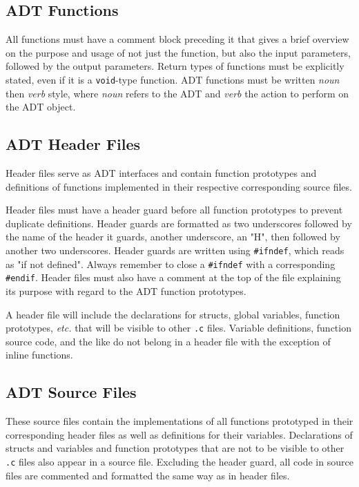 \documentclass[11pt]{article}
\begin{document}
\subsection{ADT Functions}

All functions must have a comment block preceding it that gives a brief overview
on the purpose and usage of not just the function, but also the input
parameters, followed by the output parameters. Return types of functions must be
explicitly stated, even if it is a \texttt{void}-type function. ADT functions
must be written \emph{noun} then \emph{verb} style, where \emph{noun} refers to
the ADT and \emph{verb} the action to perform on the ADT object.


\subsection{ADT Header Files} \label{headers}

Header files serve as ADT interfaces and contain function prototypes and
definitions of functions implemented in their respective corresponding source
files.

Header files must have a header guard before all function prototypes to prevent
duplicate definitions. Header guards are formatted as two underscores followed
by the name of the header it guards, another underscore, an "H", then followed
by another two underscores. Header guards are written using \texttt{\#ifndef},
which reads as "if not defined". Always remember to close a \texttt{\#ifndef}
with a corresponding \texttt{\#endif}. Header files must also have a comment at
the top of the file explaining its purpose with regard to the ADT function
prototypes.

A header file will include the declarations for structs, global variables,
function prototypes, \emph{etc.} that will be visible to other \texttt{.c}
files. Variable definitions, function source code, and the like do not belong in
a header file with the exception of inline functions.


\subsection{ADT Source Files}

These source files contain the implementations of all functions prototyped in
their corresponding header files as well as definitions for their variables.
Declarations of structs and variables and function prototypes that are not to be
visible to other \texttt{.c} files also appear in a source file.  Excluding the
header guard, all code in source files are commented and formatted the same way
as in header files.
\end{document}
